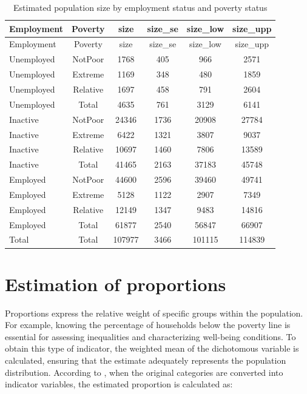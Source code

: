 \documentclass[
  english,
  12pt,
]{book}
\begin{document}
\begin{longtable}[]{@{}lccccc@{}}
\caption{\label{tab:tab-tamano-empleo-pobreza}Estimated population size by employment status and poverty status}\tabularnewline
\toprule\noalign{}
Employment & Poverty & size & size\_se & size\_low & size\_upp \\
\midrule\noalign{}
\endfirsthead
\toprule\noalign{}
Employment & Poverty & size & size\_se & size\_low & size\_upp \\
\midrule\noalign{}
\endhead
\bottomrule\noalign{}
\endlastfoot
Unemployed & NotPoor & 1768 & 405 & 966 & 2571 \\
Unemployed & Extreme & 1169 & 348 & 480 & 1859 \\
Unemployed & Relative & 1697 & 458 & 791 & 2604 \\
Unemployed & Total & 4635 & 761 & 3129 & 6141 \\
Inactive & NotPoor & 24346 & 1736 & 20908 & 27784 \\
Inactive & Extreme & 6422 & 1321 & 3807 & 9037 \\
Inactive & Relative & 10697 & 1460 & 7806 & 13589 \\
Inactive & Total & 41465 & 2163 & 37183 & 45748 \\
Employed & NotPoor & 44600 & 2596 & 39460 & 49741 \\
Employed & Extreme & 5128 & 1122 & 2907 & 7349 \\
Employed & Relative & 12149 & 1347 & 9483 & 14816 \\
Employed & Total & 61877 & 2540 & 56847 & 66907 \\
Total & Total & 107977 & 3466 & 101115 & 114839 \\
\end{longtable}

\section{Estimation of proportions}\label{estimacion-de-proporciones}

Proportions express the relative weight of specific groups within the population. For example, knowing the percentage of households below the poverty line is essential for assessing inequalities and characterizing well-being conditions. To obtain this type of indicator, the weighted mean of the dichotomous variable is calculated, ensuring that the estimate adequately represents the population distribution. According to \citet{heeringa2017applied}, when the original categories are converted into indicator variables, the estimated proportion is calculated as:
\end{document}
